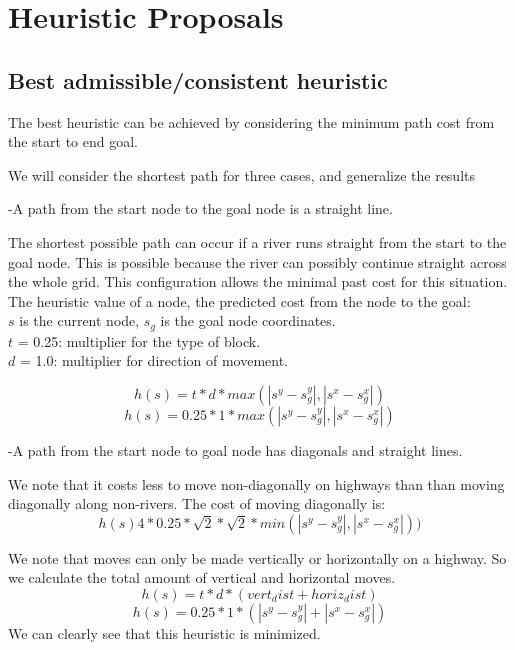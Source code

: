\section{Heuristic Proposals}



\subsection{Best admissible/consistent heuristic}

The best heuristic can be achieved by considering the minimum path cost from the start to end goal.

We will consider the shortest path for three cases, and generalize the results 

-A path from the start node to the goal node is a straight line.

The shortest possible path can occur if a river runs straight from the start to the goal node. This is possible because the river can possibly continue straight across the whole grid. This configuration allows the minimal past cost for this situation. The heuristic value of a node, the predicted cost from the node to the goal:
\\ $s$ is the current node, $s_g$ is the goal node coordinates.
\\ $t$ = 0.25: multiplier for the type of block.
\\ $d$ = 1.0: multiplier for direction of movement.

\[h(s) = t * d  * max(|s^y - s_g^y|,|s^x - s_g^x|)\]
\[h(s) = 0.25 * 1 * max(|s^y - s_g^y|,|s^x - s_g^x|)\]


-A path from the start node to goal node has diagonals and straight lines.

We note that it costs less to move non-diagonally on highways than than moving diagonally along non-rivers. The cost of moving diagonally is:
\[h(s) 4 * 0.25 * \sqrt{2} * \sqrt{2} * min(|s^y - s_g^y|,|s^x - s_g^x|))\]

We note that moves can only be made vertically or horizontally on a highway. So we calculate the total amount of vertical and horizontal moves.
\[h(s) = t * d  * (vert_dist + horiz_dist) \]
\[h(s) = 0.25 * 1 * ( |s^y - s_g^y| + |s^x - s_g^x| )\]
We can clearly see that this heuristic is minimized.


